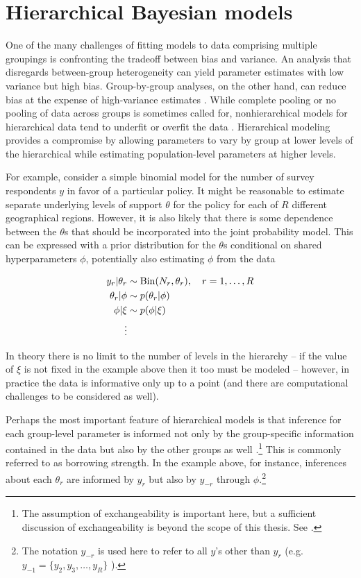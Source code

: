 \section{Hierarchical Bayesian models}
\label{hierarchical}

One of the many challenges of fitting models to data comprising multiple groupings is confronting the tradeoff between bias and variance. An analysis that disregards between-group heterogeneity can yield parameter estimates with low variance but high bias. Group-by-group analyses, on the other hand, can reduce bias at the expense of high-variance estimates . While complete pooling or no pooling of data across groups is sometimes called for, nonhierarchical models for hierarchical data tend to underfit or overfit the data . Hierarchical modeling provides a compromise by allowing parameters to vary by group at lower levels of the hierarchical while estimating population-level parameters at higher levels. 

For example, consider a simple binomial model for the number of survey respondents $y$ in favor of a particular policy. It might be reasonable to estimate separate underlying levels of support $\theta$ for the policy for each of $R$ different geographical regions. However, it is also likely that there is some dependence between the $\theta$s that should be incorporated into the joint probability model. This can be expressed with a prior distribution for the $\theta$s conditional on shared hyperparameters $\phi$, potentially also estimating $\phi$ from the data 

\begin{align*}
y_r | \theta_r &\sim {\rm Bin}(N_r, \theta_r), \quad r = 1, \dots, R \\
\theta_r  | \phi &\sim p(\theta_r | \phi) \\
\phi | \xi & \sim p(\phi | \xi)  \\
\vdots
\end{align*}

In theory there is no limit to the number of levels in the hierarchy -- if the value of $\xi$ is not fixed in the example above then it too must be modeled -- however, in practice the data is informative only up to a point (and there are computational challenges to be considered as well). 

Perhaps the most important feature of hierarchical models is that inference for each group-level parameter is informed not only by the group-specific information contained in the data but also by the other groups as well .\footnote{The assumption of exchangeability is important here, but a sufficient discussion of exchangeability is beyond the scope of this thesis. See .} This is commonly referred to as borrowing strength. In the example above, for instance, inferences about each $\theta_r$ are informed by $y_r$ but also by $y_{-r}$ through $\phi$.\footnote{The notation $y_{-r}$ is used here to refer to all $y$'s other than $y_r$ (e.g. $y_{-1} =  \{y_2, y_3, \dots, y_R\}$ ).} 

